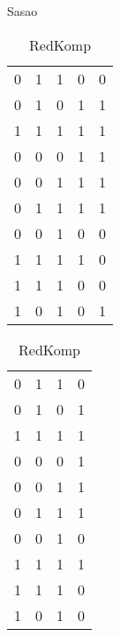 \begin{table}[t]
\begin{subtable}{.64\linewidth}
\end{subtable}
\begin{subtable}{.12\linewidth}
\caption{Sasao}
\label{sasao-b}
\begin{tabular}{|r@{}c@{}c@{}c@{}l|}
\hline
0 & 1 & 1 & 0 & 0 \\
0 & 1 & 0 & 1 & 1 \\
1 & 1 & 1 & 1 & 1 \\
0 & 0 & 0 & 1 & 1 \\
0 & 0 & 1 & 1 & 1 \\
0 & 1 & 1 & 1 & 1 \\
0 & 0 & 1 & 0 & 0 \\
1 & 1 & 1 & 1 & 0 \\
1 & 1 & 1 & 0 & 0 \\
1 & 0 & 1 & 0 & 1 \\
\hline
\end{tabular}
\end{subtable}
\begin{subtable}{.16\linewidth}
\caption{RedKomp}
\label{sasao-c}
\begin{tabular}{|r@{}c@{}c@{}l|}
\hline
0 & 1 & 1 & 0 \\
0 & 1 & 0 & 1 \\
1 & 1 & 1 & 1 \\
0 & 0 & 0 & 1 \\
0 & 0 & 1 & 1 \\
0 & 1 & 1 & 1 \\
0 & 0 & 1 & 0 \\
1 & 1 & 1 & 1 \\
1 & 1 & 1 & 0 \\
1 & 0 & 1 & 0 \\
\hline
\end{tabular}
\end{subtable}
\end{table}